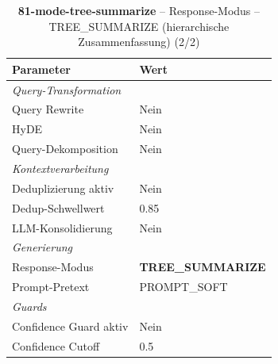 \begin{table}[H]
\centering
\small
\setlength{\tabcolsep}{4pt}
\begin{tabular}{lp{8cm}}
\toprule
\textbf{Parameter} & \textbf{Wert} \\
\midrule
\multicolumn{2}{l}{\textit{Query-Transformation}} \\
\midrule
\quad Query Rewrite & Nein \\
\quad HyDE & Nein \\
\quad Query-Dekomposition & Nein \\
\midrule
\multicolumn{2}{l}{\textit{Kontextverarbeitung}} \\
\midrule
\quad Deduplizierung aktiv & Nein \\
\quad Dedup-Schwellwert & 0.85 \\
\quad LLM-Konsolidierung & Nein \\
\midrule
\multicolumn{2}{l}{\textit{Generierung}} \\
\midrule
\quad Response-Modus & \textbf{TREE\_SUMMARIZE} \\
\quad Prompt-Pretext & PROMPT\_SOFT \\
\midrule
\multicolumn{2}{l}{\textit{Guards}} \\
\midrule
\quad Confidence Guard aktiv & Nein \\
\quad Confidence Cutoff & 0.5 \\
\bottomrule
\end{tabular}
\caption{\textbf{81-mode-tree-summarize} -- Response-Modus -- TREE\_SUMMARIZE (hierarchische Zusammenfassung) (2/2)}
\label{tab:config_81_mode_tree_summarize_b}
\end{table}